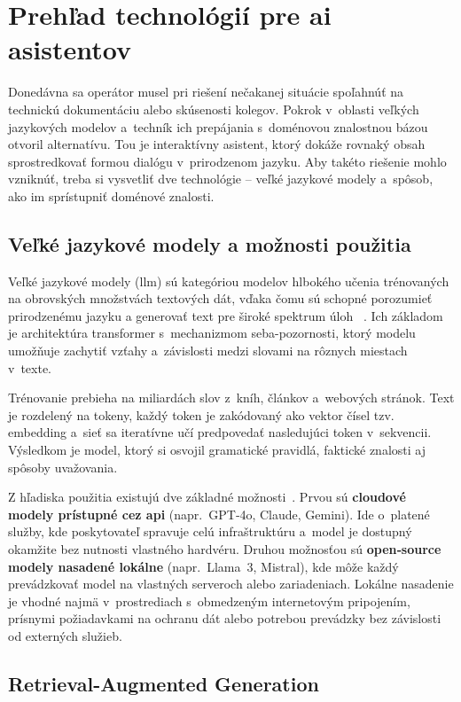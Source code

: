 \section{Prehľad technológií pre \acrshort{ai} asistentov}

Donedávna sa operátor musel pri riešení nečakanej situácie spoľahnúť
na technickú dokumentáciu alebo skúsenosti kolegov. Pokrok v~oblasti
veľkých jazykových modelov a~techník ich prepájania s~doménovou znalostnou
bázou otvoril alternatívu. Tou je interaktívny asistent, ktorý dokáže rovnaký
obsah sprostredkovať formou dialógu v~prirodzenom jazyku. Aby takéto
riešenie mohlo vzniknúť, treba si vysvetliť dve technológie -- veľké
jazykové modely a~spôsob, ako im sprístupniť doménové znalosti.

\subsection{Veľké jazykové modely a možnosti použitia}
Veľké jazykové modely (\acrshort{llm}) sú kategóriou modelov hlbokého učenia
trénovaných na obrovských množstvách textových dát, vďaka čomu sú schopné
porozumieť prirodzenému jazyku a generovať text pre široké spektrum úloh
~\cite{t16}. Ich základom je architektúra transformer s~mechanizmom
seba-pozornosti, ktorý modelu umožňuje zachytiť vzťahy a~závislosti medzi
slovami na rôznych miestach v~texte.

Trénovanie prebieha na miliardách slov z~kníh, článkov a~webových stránok. Text
je rozdelený na tokeny, každý token je zakódovaný ako vektor čísel tzv.
embedding a~sieť sa iteratívne učí predpovedať nasledujúci token v~sekvencii.
Výsledkom je model, ktorý si osvojil gramatické pravidlá, faktické znalosti aj
spôsoby uvažovania.

Z hľadiska použitia existujú dve základné možnosti~\cite{t17}. Prvou sú
\textbf{cloudové modely prístupné cez \acrshort{api}} (napr.\ GPT‑4o, Claude,
Gemini). Ide o~platené služby, kde poskytovateľ spravuje celú infraštruktúru
a~model je dostupný okamžite bez nutnosti vlastného hardvéru. Druhou možnosťou
sú \textbf{open‑source modely nasadené lokálne} (napr.\ Llama~3, Mistral), kde
môže každý prevádzkovať model na vlastných serveroch alebo zariadeniach.
Lokálne nasadenie je vhodné najmä v~prostrediach s~obmedzeným internetovým
pripojením, prísnymi požiadavkami na ochranu dát alebo potrebou prevádzky bez
závislosti od externých služieb.

\newpage
\subsection{Retrieval-Augmented Generation}

